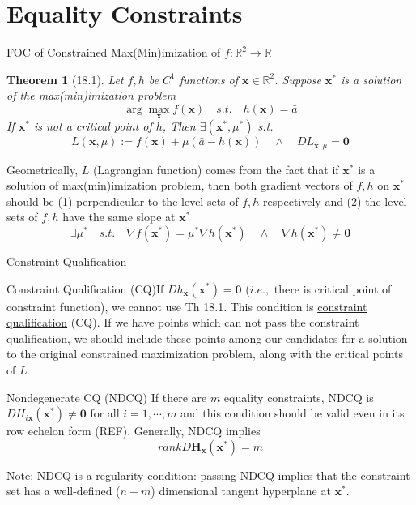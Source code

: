 \documentclass[final]{beamer}
\newtheorem{thm}{Theorem}
\newcommand{\bb}{\mathbb}
\newcommand{\bd}{\mathbf}
\begin{document}
\section{Equality Constraints} %
\label{sec:equality_constraints}
\begin{frame}[t]{FOC of Constrained Max(Min)imization of $f:\bb{R}^2\rightarrow\bb{R}$}
	\begin{thm}
		[18.1] Let $f,h$ be $C^1$ functions of $\bd{x}\in\bb{R}^2$. Suppose $\bd{x^\ast}$ is a solution of the max(min)imization problem\[
			\arg\max_{\bd{x}} f(\bd{x}) \quad s.t. \quad h(\bd{x})=\bar a
		\]
		If $\bd{x^\ast}$ is not a critical point of $h$, Then $\exists (\bd{x}^\ast,\mu^\ast)$ s.t. \[
			L(\bd{x},\mu):= f(\bd{x})+\mu(\bar{a}-h(\bd{x}))\quad\land\quad DL_{\bd{x},\mu}=\bd{0}
		\]
	\end{thm}
	Geometrically, $L$ (Lagrangian function) comes from the fact that if $\bd{x^\ast}$ is a solution of max(min)imization problem, then both gradient vectors of $f,h$ on $\bd{x^\ast}$ should be (1) perpendicular to the level sets of $f,h$ respectively and (2) the level sets of $f,h$ have the same slope at $\bd{x^\ast}$\[
		\exists \mu^\ast \quad s.t.\quad \nabla f (\bd{x^\ast}) = \mu^\ast \nabla h (\bd{x^\ast}) \quad \land\quad \nabla h(\bd{x^\ast})\neq\bd{0}
	\]
\end{frame}
\begin{frame}[t]{Constraint Qualification}
	\begin{block}
		{Constraint Qualification (CQ)}If $Dh_{\bd{x}}(\bd{x^\ast})=\mathbf{0}$ ($i.e.,$ there is critical point of constraint function),  we cannot use Th 18.1. This condition is \uline{constraint qualification} (CQ). If we have points which can not pass the constraint qualification, we should include these points among our candidates for a solution to the original constrained maximization problem, along with the critical points of $L$
	\end{block}
	\begin{block}
		{Nondegenerate CQ (NDCQ)} If there are $m$ equality constraints, NDCQ is $DH_{i\bd{x}}(\bd{x^\ast})\neq \bd{0}$ for all $i=1,\cdots,m$ and this condition should be valid even in its row echelon form (REF). Generally, NDCQ implies \[
			rank D\bd{H}_{\bd{x}}(\bd{x^\ast}) = m
		\]
	\end{block}
	Note: NDCQ is a regularity condition: passing NDCQ implies that the constraint set has a well-defined ($n-m$) dimensional tangent hyperplane at $\bd{x^\ast}$.
\end{frame}
\end{document}
